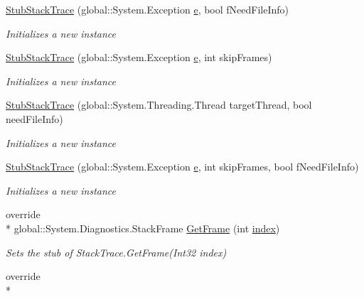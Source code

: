 \begin{DoxyCompactItemize}
\hyperlink{class_system_1_1_diagnostics_1_1_fakes_1_1_stub_stack_trace_a5909cabf56f39d462e33767d92ea4cfd}{Stub\-Stack\-Trace} (global\-::\-System.\-Exception \hyperlink{jquery-1_810_82_8min_8js_a2c038346d47955cbe2cb91e338edd7e1}{e}, bool f\-Need\-File\-Info)
\begin{DoxyCompactList}\small\item\em Initializes a new instance\end{DoxyCompactList}\item 
\hyperlink{class_system_1_1_diagnostics_1_1_fakes_1_1_stub_stack_trace_a1f08efee277e50e7897f170ca710d443}{Stub\-Stack\-Trace} (global\-::\-System.\-Exception \hyperlink{jquery-1_810_82_8min_8js_a2c038346d47955cbe2cb91e338edd7e1}{e}, int skip\-Frames)
\begin{DoxyCompactList}\small\item\em Initializes a new instance\end{DoxyCompactList}\item 
\hyperlink{class_system_1_1_diagnostics_1_1_fakes_1_1_stub_stack_trace_a704e437cc7940b171a8b6ccbd0696c71}{Stub\-Stack\-Trace} (global\-::\-System.\-Threading.\-Thread target\-Thread, bool need\-File\-Info)
\begin{DoxyCompactList}\small\item\em Initializes a new instance\end{DoxyCompactList}\item 
\hyperlink{class_system_1_1_diagnostics_1_1_fakes_1_1_stub_stack_trace_a335f59e2014d64fdb85cbf8c884ad54f}{Stub\-Stack\-Trace} (global\-::\-System.\-Exception \hyperlink{jquery-1_810_82_8min_8js_a2c038346d47955cbe2cb91e338edd7e1}{e}, int skip\-Frames, bool f\-Need\-File\-Info)
\begin{DoxyCompactList}\small\item\em Initializes a new instance\end{DoxyCompactList}\item 
override \\*
global\-::\-System.\-Diagnostics.\-Stack\-Frame \hyperlink{class_system_1_1_diagnostics_1_1_fakes_1_1_stub_stack_trace_acd1233aaef33d2fa501397e0357d6e3a}{Get\-Frame} (int \hyperlink{jquery-1_810_82-vsdoc_8js_a75bb12d1f23302a9eea93a6d89d0193e}{index})
\begin{DoxyCompactList}\small\item\em Sets the stub of Stack\-Trace.\-Get\-Frame(\-Int32 index)\end{DoxyCompactList}\item 
override \\*

\end{DoxyCompactItemize}

